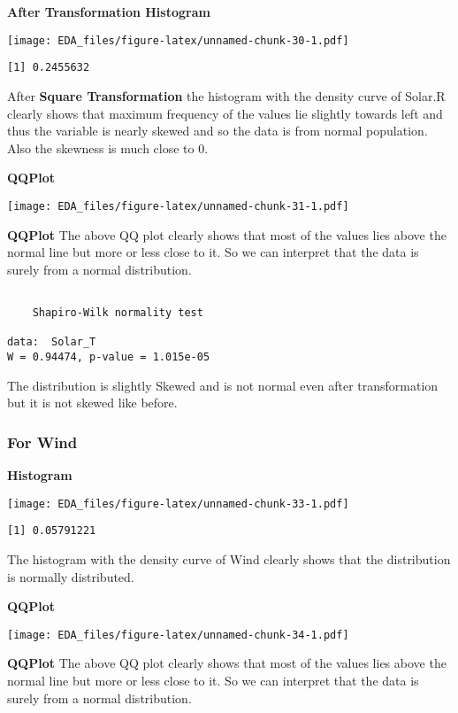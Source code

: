 \documentclass[12pt,]{article}
\begin{document}
\textbf{After Transformation Histogram}

\texttt{[image: EDA\_files/figure-latex/unnamed-chunk-30-1.pdf]}

\begin{verbatim}
[1] 0.2455632
\end{verbatim}

After \textbf{Square Transformation} the histogram with the density
curve of Solar.R clearly shows that maximum frequency of the values lie
slightly towards left and thus the variable is nearly skewed and so the
data is from normal population. Also the skewness is much close to 0.

\textbf{QQPlot}

\texttt{[image: EDA\_files/figure-latex/unnamed-chunk-31-1.pdf]}

\textbf{QQPlot} The above QQ plot clearly shows that most of the values
lies above the normal line but more or less close to it. So we can
interpret that the data is surely from a normal distribution.

\begin{verbatim}

    Shapiro-Wilk normality test

data:  Solar_T
W = 0.94474, p-value = 1.015e-05
\end{verbatim}

The distribution is slightly Skewed and is not normal even after
transformation but it is not skewed like before.

\subsubsection{\texorpdfstring{\textbf{For
Wind}}{For Wind}}\label{for-wind}

\textbf{Histogram}

\texttt{[image: EDA\_files/figure-latex/unnamed-chunk-33-1.pdf]}

\begin{verbatim}
[1] 0.05791221
\end{verbatim}

The histogram with the density curve of Wind clearly shows that the
distribution is normally distributed.

\textbf{QQPlot}

\texttt{[image: EDA\_files/figure-latex/unnamed-chunk-34-1.pdf]}

\textbf{QQPlot} The above QQ plot clearly shows that most of the values
lies above the normal line but more or less close to it. So we can
interpret that the data is surely from a normal distribution.
\end{document}
